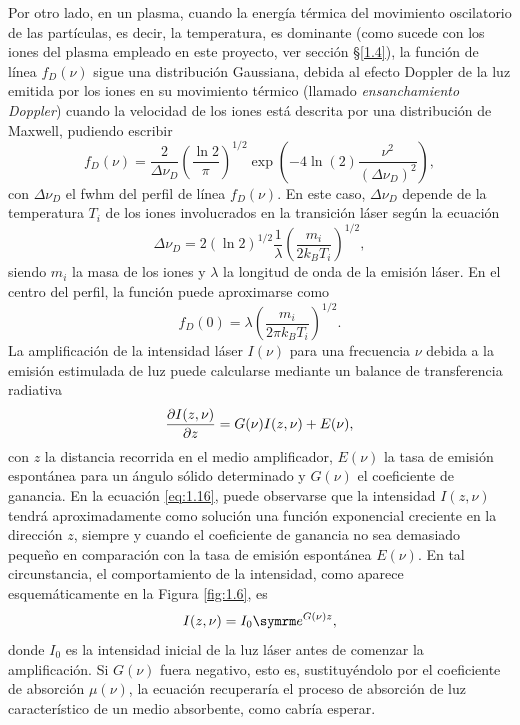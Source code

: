 Por otro lado, en un plasma, cuando la energía térmica del movimiento oscilatorio de las partículas, es decir, la temperatura, es dominante (como sucede con los iones del plasma empleado en este proyecto, ver sección \S\ref{1.4}), la función de línea $f_{D}(\nu)$ sigue una distribución Gaussiana, debida al efecto Doppler de la luz emitida por los iones en su movimiento térmico (llamado \emph{ensanchamiento Doppler})  cuando la velocidad de los iones está descrita por una distribución de Maxwell, pudiendo escribir \autocite{Tallents2003,Milonni1988,Oliva2010}
\begin{equation}\label{eq:1.13}
f_{D}(\nu) = \frac{2}{\Delta \nu_{D}} \left(\frac{\ln 2}{\pi}\right)^{1/2} \exp \left(-4 \ln(2) \frac{\nu^{2}}{(\Delta \nu_{D})^{2}}\right),
\end{equation}
con $\Delta \nu_{D}$ el \acrshort{fwhm} del perfil de línea $f_{D}(\nu)$. En este caso, $\Delta \nu_{D}$ depende de la temperatura $T_{i}$ de los iones involucrados en la transición láser según la ecuación
\begin{equation}\label{eq:1.14}
  \Delta \nu_{D} = 2(\ln 2)^{1/2} \frac{1}{\lambda}\left(\frac{m_{i}}{2k_{B}T_{i}}\right)^{1/2},
\end{equation}
siendo $m_{i}$ la masa de los iones y $\lambda$ la longitud de onda de la emisión láser. En el centro del perfil, la función puede aproximarse como
\begin{equation}\label{eq:1.15}
  f_{D}(0) = \lambda \left(\frac{m_{i}}{2 \pi k_{B}T_{i}}\right)^{1/2}.
\end{equation}
La amplificación de la intensidad láser $I(\nu)$ para una frecuencia $\nu$ debida a la emisión estimulada de luz puede calcularse mediante un balance de transferencia radiativa \autocite{Milonni1988}
\begin{equation}\label{eq:1.16}
  \frac{\partial I(z,\nu)}{\partial z} = G(\nu)I(z,\nu) + E(\nu),
\end{equation}
con $z$ la distancia recorrida en el medio amplificador, $E(\nu)$ la tasa de emisión espontánea para un ángulo sólido determinado y $G(\nu)$ el coeficiente de ganancia. En la ecuación \eqref{eq:1.16}, puede observarse que la intensidad $I(z,\nu)$ tendrá aproximadamente como solución una función exponencial creciente en la dirección $z$, siempre y cuando el coeficiente de ganancia no sea demasiado pequeño en comparación con la tasa de emisión espontánea $E(\nu)$. En tal circunstancia, el comportamiento de la intensidad, como aparece esquemáticamente en la Figura \ref{fig:1.6}, es
\begin{equation}\label{eq:1.17}
  I(z,\nu) = I_{0}\eu^{G(\nu)z},
\end{equation}
donde $I_{0}$ es la intensidad inicial de la luz láser antes de comenzar la amplificación. Si $G(\nu)$ fuera negativo, esto es, sustituyéndolo por el coeficiente de absorción $\mu(\nu)$, la ecuación recuperaría el proceso de absorción de luz característico de un medio absorbente, como cabría esperar. 

